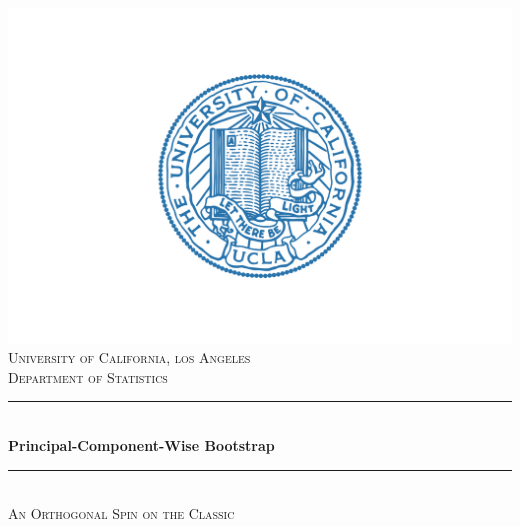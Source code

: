 \documentclass[12pt, twoside]{article}
\newcommand{\1}{\mathbb{1}}
\begin{document}
\begin{titlepage}

    \newcommand{\HRule}{\rule{\linewidth}{0.5mm}} %

    \center %
 
    \includegraphics[scale = 0.22]{campus-seal.jpg}\\[0.5cm]
    
     \textsc{\large University of California, los Angeles}\\[0.2cm] %
     \textsc{\large Department of Statistics}\\[0.5cm]

    \HRule \\[0.4cm]
    { \huge \bfseries Principal-Component-Wise Bootstrap}\\[0.2cm] %
    \HRule \\[0.4cm]
    \textsc{\large An Orthogonal Spin on the Classic}\\[2.0 cm]
 
    

\end{titlepage}
\end{document}
